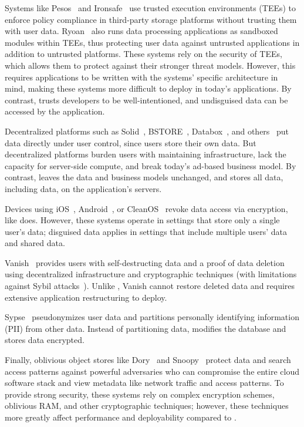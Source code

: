%
Systems like Pesos~\cite{pesos} and Ironsafe~\cite{ironsafe} use trusted
execution environments (TEEs) to enforce policy compliance in third-party
storage platforms without trusting them with user data. 
%
Ryoan~\cite{ryoan} also runs data processing applications as sandboxed modules
within TEEs, thus protecting user data against untrusted applications in
addition to untrusted platforms.
%
These systems rely on the security of TEEs, which allows them to protect against
their stronger threat models. However, this requires applications to be written
with the systems' specific architecture in mind, making these systems more
difficult to deploy in today's applications.
%
By contrast, \sys trusts developers to be well-intentioned, and undisguised data
can be accessed by the application.
%

Decentralized platforms such as Solid~\cite{solid}, BSTORE~\cite{bstore},
Databox~\cite{databox}, and others~\cite{diy, amber, oort, w5, blockstack} put
data directly under user control, since users store their own data.
%
But decentralized platforms burden users with maintaining infrastructure, lack
the capacity for server-side compute, and break today's ad-based
business model.
%
By contrast, \sys leaves the data and business models unchanged,
and stores all data, including \xxed data, on the application's servers.
%

%
Devices using iOS~\cite{applesecurity}, Android~\cite{applesecurity}, or
CleanOS~\cite{cleanos} revoke data access via encryption, like \sys does.
%
However, these systems operate in settings that store only a single user's data;
disguised data applies in settings that include multiple users' data and shared
data.
%

%
Vanish~\cite{vanish} provides users with self-destructing data and a proof of
data deletion using decentralized infrastructure and cryptographic techniques
(with limitations against Sybil attacks~\cite{defeat_vanish}). Unlike \sys,
Vanish cannot restore deleted data and requires extensive application
restructuring to deploy.
%

%
Sypse~\cite{sypse} pseudonymizes user data and partitions personally identifying
information (PII) from other data. Instead of partitioning data, \sys modifies
the database and stores \xxed data encrypted.
%

%
Finally, oblivious object stores like Dory~\cite{dory} and Snoopy~\cite{snoopy}
protect data and search access patterns against powerful adversaries who can \eg
compromise the entire cloud software stack and view metadata like network
traffic and access patterns. To provide strong security, these systems rely on
complex encryption schemes, oblivious RAM, and other cryptographic techniques;
however, these techniques more greatly affect performance and deployability
compared to \sys.
%

